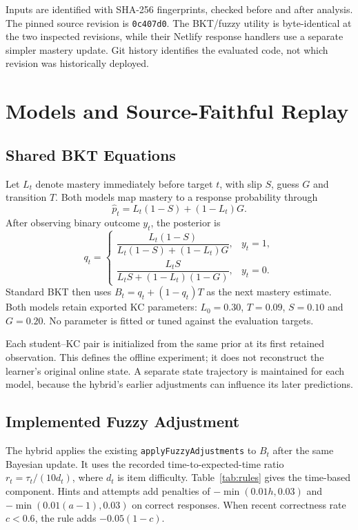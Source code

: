 \documentclass[conference]{IEEEtran}
\begin{document}
Inputs are identified with SHA-256 fingerprints, checked before and after analysis. The pinned source revision is \texttt{0c407d0}. The BKT/fuzzy utility is byte-identical at the two inspected revisions, while their Netlify response handlers use a separate simpler mastery update. Git history identifies the evaluated code, not which revision was historically deployed.

\section{Models and Source-Faithful Replay}
\subsection{Shared BKT Equations}
Let $L_t$ denote mastery immediately before target $t$, with slip $S$, guess $G$ and transition $T$. Both models map mastery to a response probability through
\begin{equation}
\widehat p_t=L_t(1-S)+(1-L_t)G.
\label{eq:predict}
\end{equation}
After observing binary outcome $y_t$, the posterior is
\begin{equation}
q_t=\begin{cases}
\dfrac{L_t(1-S)}{L_t(1-S)+(1-L_t)G},& y_t=1,\\[6pt]
\dfrac{L_tS}{L_tS+(1-L_t)(1-G)},& y_t=0.
\end{cases}
\end{equation}
Standard BKT then uses $B_t=q_t+(1-q_t)T$ as the next mastery estimate. Both models retain exported KC parameters: $L_0=0.30$, $T=0.09$, $S=0.10$ and $G=0.20$. No parameter is fitted or tuned against the evaluation targets.

Each student--KC pair is initialized from the same prior at its first retained observation. This defines the offline experiment; it does not reconstruct the learner's original online state. A separate state trajectory is maintained for each model, because the hybrid's earlier adjustments can influence its later predictions.

\subsection{Implemented Fuzzy Adjustment}
The hybrid applies the existing \texttt{applyFuzzyAdjustments} to $B_t$ after the same Bayesian update. It uses the recorded time-to-expected-time ratio $r_t=\tau_t/(10d_t)$, where $d_t$ is item difficulty. Table~\ref{tab:rules} gives the time-based component. Hints and attempts add penalties of $-\min(0.01h,0.03)$ and $-\min(0.01(a-1),0.03)$ on correct responses. When recent correctness rate $c<0.6$, the rule adds $-0.05(1-c)$.
\end{document}
